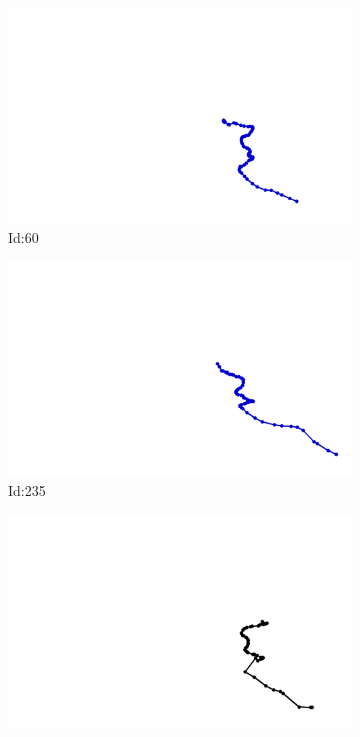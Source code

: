 \documentclass[12pt,twoside]{report}
\begin{document}
\begin{figure}
\centering
\begin{subfigure}[b]{0.20\textwidth}
\centering
\includegraphics[width=\textwidth]{../../trajectories/60.png}
\caption{Id:60}
\end{subfigure}
\begin{subfigure}[b]{0.20\textwidth}
\centering
\includegraphics[width=\textwidth]{../../trajectories/235.png}
\caption{Id:235}
\end{subfigure}
\begin{subfigure}[b]{0.20\textwidth}
\centering
\includegraphics[width=\textwidth]{../../trajectories/514.png}

\end{subfigure}
\end{figure}
\end{document}
